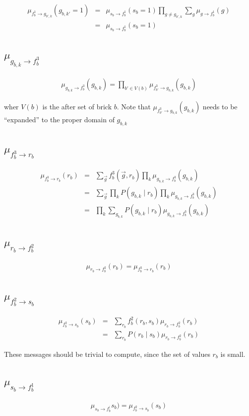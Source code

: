 \documentclass[11pt]{article}
\newcommand{\fb}[1]{f_b^{#1}}
\newcommand{\mSbFb}[1]{\mu_{s_{b} \rightarrow \fb{#1}}}
\newcommand{\mFbSb}[1]{\mu_{ \fb{#1} \rightarrow s_{b}}}
\newcommand{\mFbRb}[1]{\mu_{ \fb{#1} \rightarrow r_{b}}}
\newcommand{\mRbFb}[1]{\mu_{ r_{b} \rightarrow  \fb{#1}}}
\newcommand{\mGbkFb}[1]{\mu_{  g_{b,k} \rightarrow \fb{#1}}}
\begin{document}
\begin{eqnarray}
\mu_{\fb1 \rightarrow g_{b',k}}(g_{b,k'}=1) &=& \mSbFb1(s_b=1) \prod_{g \neq g_{b',k}} \sum_{g}  \mu_{g \rightarrow \fb1}(g) \\
&=&  \mSbFb1(s_b=1) 
\end{eqnarray}

\subsection{$\mGbkFb3$}

\begin{eqnarray}
\mGbkFb3(g_{b,k}) = \prod_{b' \in V(b)} \mu_{f_{b'}^3 \rightarrow g_{b,k}}(g_{b,k})
\end{eqnarray}

wher $V(b)$ is the after set of brick $b$. Note that $ \mu_{f_{b'}^3 \rightarrow g_{b,k}}(g_{b,k})$ needs to be ``expanded'' to the proper domain of $g_{b,k}$

\subsection{$\mFbRb3$}

\begin{eqnarray}
\mFbRb3(r_{b}) &=& \sum_{\vec{g}} \fb3(\vec{g},r_b) \prod_{k} \mGbkFb3(g_{b,k}) \\
&=& \sum_{\vec{g}}\prod_{k} P(g_{b,k} \mid r_b) \prod_{k} \mGbkFb3(g_{b,k}) \\
&=&\prod_{k} \sum_{g_{b,k}} P(g_{b,k} \mid r_b) \mGbkFb3(g_{b,k})
\end{eqnarray}

\subsection{$\mRbFb2$}

\begin{eqnarray}
\mRbFb2(r_b) = \mFbRb3(r_b)
\end{eqnarray}

\subsection{$\mFbSb2$}

\begin{eqnarray}
\mFbSb2(s_b) &=& \sum_{r_b} \fb2(r_b,s_b) \mRbFb2(r_b) \\
&=&  \sum_{r_b} P(r_b \mid s_b) \mRbFb2(r_b)
\end{eqnarray}

These messages should be trivial to compute, since the set of values $r_b$ is small.

\subsection{$\mSbFb1$}

\begin{eqnarray}
\mSbFb(s_b) = \mFbSb2(s_b)
\end{eqnarray}
\end{document}
